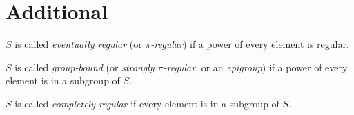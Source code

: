 \documentclass[12pt]{article}
\begin{document}
\section{Additional}
$S$ is called \emph{eventually regular} (or \emph{$\pi$-regular}) if a power of every element is regular.

$S$ is called \emph{group-bound} (or \emph{strongly $\pi$-regular}, or an \emph{epigroup}) if a power of every element is in a subgroup of $S$.

$S$ is called \emph{completely regular} if every element is in a subgroup of $S$.
\end{document}
